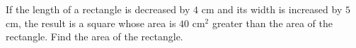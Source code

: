 If the length of a rectangle is decreased by $4$ cm and its width is increased by $5$ cm, the result is a square whose area is $40\text{ cm}^2$ greater than the area of the rectangle. Find the area of the rectangle.
